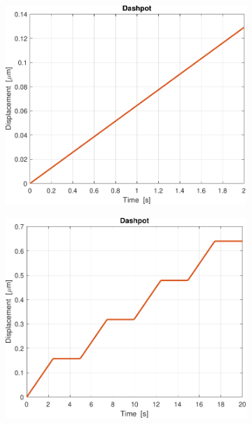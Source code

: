 \begin{figure}[t!]
	\begin{subfigure}{0.33\linewidth}
		\centering
		\includegraphics[width=0.95\linewidth]{../code/figs/step_dashpot_}
		\caption{}
	\end{subfigure}\hfill
	\begin{subfigure}{0.33\linewidth}
		\centering
		\includegraphics[width=0.95\linewidth]{../code/figs/square_dashpot_}
		\caption{}
	\end{subfigure}\hfill
	\begin{subfigure}{0.33\linewidth}
		\centering

\end{subfigure}
\end{figure}
